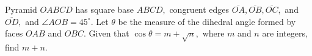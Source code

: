Pyramid $OABCD$ has square base $ABCD,$ congruent edges $\overline{OA}, \overline{OB}, \overline{OC},$ and $\overline{OD},$ and $\angle AOB=45^\circ.$  Let $\theta$ be the measure of the dihedral angle formed by faces $OAB$ and $OBC.$  Given that $\cos \theta=m+\sqrt{n},$ where $m$ and $n$ are integers, find $m+n.$